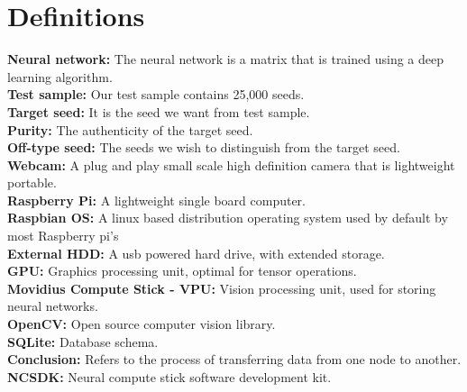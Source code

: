 \section{Definitions}
\textbf{Neural network:} The neural network is a matrix that is trained using a deep learning algorithm. \\
\textbf{Test sample:} Our test sample contains 25,000 seeds. \\
\textbf{Target seed:} It is the seed we want from test sample. \\
\textbf{Purity:} The authenticity of the target seed. \\
\textbf{Off-type seed:} The seeds we wish to distinguish from the target seed. \\
\textbf{Webcam:} A plug and play small scale high definition camera that is lightweight portable. \\
\textbf{Raspberry Pi:} A lightweight single board computer. \\
\textbf{Raspbian OS:} A linux based distribution operating system used by default by most Raspberry pi's\\
\textbf{External HDD:} A usb powered hard drive, with extended storage. \\
\textbf{GPU:} Graphics processing unit, optimal for tensor operations. \\
\textbf{Movidius Compute Stick - VPU:} Vision processing unit, used for storing neural networks.\\
\textbf{OpenCV:} Open source computer vision library. \\
\textbf{SQLite:} Database schema. \\
\textbf{Conclusion:} Refers to the process of transferring data from one node to another. \\
\textbf{NCSDK:} Neural compute stick software development kit. \\
